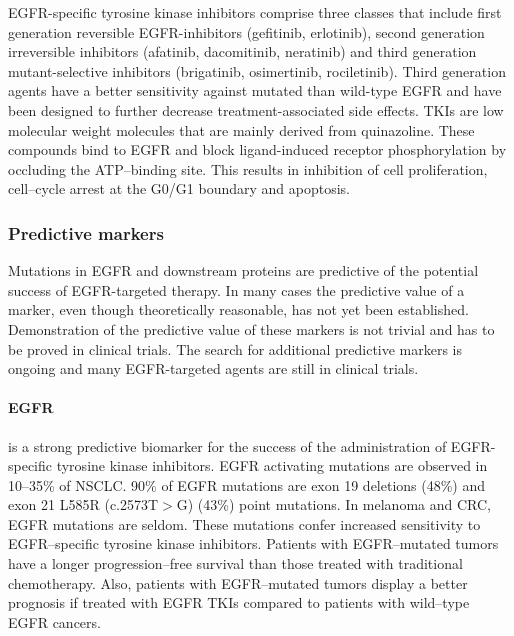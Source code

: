 {{      EGFR-specific tyrosine kinase inhibitors comprise three classes that
      include first generation reversible  EGFR-inhibitors (gefitinib,
      erlotinib), second generation irreversible inhibitors (afatinib,
      dacomitinib, neratinib) and third generation mutant-selective inhibitors
      (brigatinib, osimertinib, rociletinib). Third generation agents have a
      better sensitivity against mutated than wild-type EGFR and have been
      designed to further decrease treatment-associated side effects. TKIs
      are low molecular weight molecules that are mainly
      derived from quinazoline. These compounds bind to EGFR and block
      ligand-induced receptor phosphorylation by occluding the ATP--binding
      site. This results in inhibition of cell proliferation, cell--cycle arrest
      at the G0/G1 boundary and apoptosis.

    \subsubsection{Predictive markers}

      Mutations in EGFR and downstream proteins are predictive of the potential
      success of EGFR-targeted therapy. In many cases the predictive value of a
      marker, even though theoretically reasonable, has not yet been
      established. Demonstration of the predictive value of these markers is not
      trivial and has to be proved in clinical trials. The search for
      additional predictive markers is ongoing and many EGFR-targeted
      agents are still in clinical trials.

      \paragraph{EGFR} is a strong predictive biomarker for the success of the
      administration of EGFR-specific tyrosine kinase inhibitors. EGFR
      activating mutations are observed in 10--35\% of NSCLC. 90\% of EGFR
      mutations are exon 19 deletions (48\%) and exon 21 L585R (c.2573T$>$G)
      (43\%) point mutations. In melanoma and CRC, EGFR mutations are seldom.
      These mutations confer increased sensitivity to EGFR--specific tyrosine
      kinase inhibitors. Patients with EGFR--mutated tumors have a longer
      progression--free survival than those treated with traditional
      chemotherapy. Also, patients with EGFR--mutated tumors display a better
      prognosis if treated with EGFR TKIs compared to patients with wild--type EGFR
      cancers.

}}
